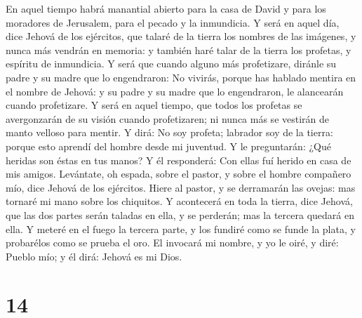  En aquel tiempo habrá manantial abierto para la casa de
David y para los moradores de Jerusalem, para el pecado y la inmundicia.
 Y será en aquel día, dice Jehová de los ejércitos, que
talaré de la tierra los nombres de las imágenes, y nunca más vendrán en
memoria: y también haré talar de la tierra los profetas, y espíritu de
inmundicia.  Y será que cuando alguno más profetizare,
diránle su padre y su madre que lo engendraron: No vivirás, porque has
hablado mentira en el nombre de Jehová: y su padre y su madre que lo
engendraron, le alancearán cuando profetizare.  Y será en
aquel tiempo, que todos los profetas se avergonzarán de su visión cuando
profetizaren; ni nunca más se vestirán de manto velloso para mentir.
 Y dirá: No soy profeta; labrador soy de la tierra: porque
esto aprendí del hombre desde mi juventud.  Y le
preguntarán: ¿Qué heridas son éstas en tus manos? Y él responderá: Con
ellas fuí herido en casa de mis amigos.  Levántate, oh
espada, sobre el pastor, y sobre el hombre compañero mío, dice Jehová de
los ejércitos. Hiere al pastor, y se derramarán las ovejas: mas tornaré
mi mano sobre los chiquitos.  Y acontecerá en toda la
tierra, dice Jehová, que las dos partes serán taladas en ella, y se
perderán; mas la tercera quedará en ella.  Y meteré en el
fuego la tercera parte, y los fundiré como se funde la plata, y
probarélos como se prueba el oro. El invocará mi nombre, y yo le oiré, y
diré: Pueblo mío; y él dirá: Jehová es mi Dios.

\hypertarget{section-13}{%
\section{14}\label{section-13}}

